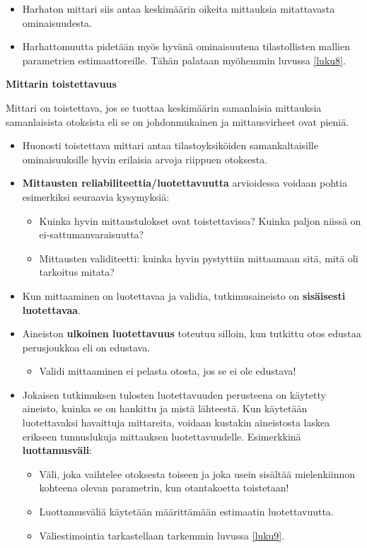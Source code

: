 \documentclass[
]{book}
\providecommand{\tightlist}{%
  \setlength{\itemsep}{0pt}\setlength{\parskip}{0pt}}
\begin{document}
\begin{itemize}
\item
  Harhaton mittari siis antaa keskimäärin oikeita mittauksia mitattavasta ominaisuudesta.
\item
  Harhattomuutta pidetään myös hyvänä ominaisuutena tilastollisten mallien parametrien estimaattoreille. Tähän palataan myöhemmin luvussa \ref{luku8}.
\end{itemize}

\begin{defblock}{}
\textbf{Mittarin toistettavuus}

Mittari on toistettava, jos se tuottaa keskimäärin samanlaisia mittauksia samanlaisista otoksista eli se on johdonmukainen ja mittausvirheet ovat pieniä.

\end{defblock}

\begin{itemize}
\item
  Huonosti toistettava mittari antaa tilastoyksiköiden samankaltaisille ominaisuuksille hyvin erilaisia arvoja riippuen otoksesta.
\item
  \textbf{Mittausten reliabiliteettia/luotettavuutta} arvioidessa voidaan pohtia esimerkiksi seuraavia kysymyksiä:

  \begin{itemize}
  \tightlist
  \item
    Kuinka hyvin mittaustulokset ovat toistettavissa? Kuinka paljon niissä on ei-sattumanvaraisuutta?
  \item
    Mittausten validiteetti: kuinka hyvin pystyttiin mittaamaan sitä, mitä oli tarkoitus mitata?
  \end{itemize}
\item
  Kun mittaaminen on luotettavaa ja validia, tutkimusaineisto on \textbf{sisäisesti luotettavaa}.
\item
  Aineiston \textbf{ulkoinen luotettavuus} toteutuu silloin, kun tutkittu otos edustaa perusjoukkoa eli on edustava.

  \begin{itemize}
  \tightlist
  \item
    Validi mittaaminen ei pelasta otosta, jos se ei ole edustava!
  \end{itemize}
\item
  Jokaisen tutkimuksen tulosten luotettavuuden perusteena on käytetty aineisto, kuinka se on hankittu ja mistä lähteestä. Kun käytetään luotettavaksi havaittuja mittareita, voidaan kustakin aineistosta laskea erikseen tunnuslukuja mittauksen luotettavuudelle. Esimerkkinä \textbf{luottamusväli}:

  \begin{itemize}
  \tightlist
  \item
    Väli, joka vaihtelee otoksesta toiseen ja joka usein sisältää mielenkiinnon kohteena olevan parametrin, kun otantakoetta toistetaan!
  \item
    Luottamusväliä käytetään määrittämään estimaatin luotettavuutta.
  \item
    Väliestimointia tarkastellaan tarkemmin luvussa \ref{luku9}.
  \end{itemize}
\end{itemize}
\end{document}
